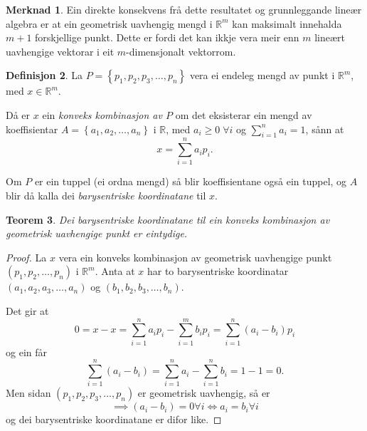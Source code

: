 \documentclass[a4paper, 12pt, norsk]{article}
\theoremstyle{plain}
\newtheorem{theorem}{Teorem}[section]
\theoremstyle{definition}
\newtheorem{definition}[theorem]{Definisjon}
\newtheorem{remark}[theorem]{Merknad}
\newcommand{\Rb}{\mathbb{R}}
\newcommand{\set}[1]{ \left\{ #1 \right\} } %
\newcommand{\tuple}[1]{ \left( #1 \right) } %
\begin{document}
\begin{remark}
	Ein direkte konsekvens frå dette resultatet og grunnleggande lineær algebra er at ein geometrisk uavhengig mengd i $\Rb^m$ kan maksimalt innehalda $m+1$ forskjellige punkt. Dette er fordi det kan ikkje vera meir enn $m$ lineært uavhengige vektorar i eit $m$-dimensjonalt vektorrom.
\end{remark}

\begin{definition}
	La \( P = \set{p_1, p_2, p_3, \dots, p_n} \) vera ei endeleg mengd av punkt i \( \Rb^m \), med \( x\in\Rb^m \).

	Då er \( x \) ein \emph{konveks kombinasjon av \( P \)} om det eksisterar ein mengd av koeffisientar \( A=\set{a_1, a_2, \dots, a_n} \) i \( \Rb \), med \( a_i \geq 0 \; \forall i \) og \( \sum_{i=1}^n a_i = 1 \), sånn at
	\[
		x=\sum_{i=1}^n a_ip_i.
	\]
	
	Om $P$ er ein tuppel (ei ordna mengd) så blir koeffisientane også ein tuppel, og $A$ blir då kalla dei \emph{barysentriske koordinatane} til $x$.
\end{definition}

\begin{theorem} \label{thm:unik-barysentrisk-koordinat}
	Dei barysentriske koordinatane til ein konveks kombinasjon av geometrisk uavhengige punkt er eintydige.
\end{theorem}

\begin{proof}
	La $x$ vera ein konveks kombinasjon av geometrisk uavhengige punkt \( \tuple{p_1, p_2, \dots, p_n} \) i $\Rb^m$. Anta at $x$ har to barysentriske koordinatar $(a_1, a_2, a_3, \dots, a_n)$ og $(b_1, b_2, b_3, \dots, b_n)$. 
	
	Det gir at
	\begin{equation*}
		0 = x - x = \sum_{i=1}^n a_ip_i - \sum_{i=1}^m b_ip_i=\sum_{i=1}^n (a_i-b_i)p_i
	\end{equation*}
	og ein får
	\begin{equation*}
		\sum_{i=1}^n(a_i-b_i)=\sum_{i=1}^na_i - \sum_{i=1}^nb_i = 1 - 1 = 0.
	\end{equation*}
	Men sidan $(p_1, p_2, p_3, \dots, p_n)$ er geometrisk uavhengig, så er
	\begin{equation*}
		\implies (a_i-b_i)=0\forall i \Longleftrightarrow a_i = b_i \forall i
	\end{equation*}
	og dei barysentriske koordinatane er difor like.
\end{proof}
\end{document}
